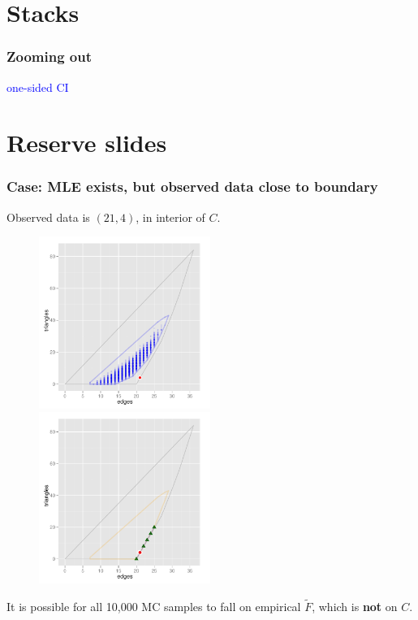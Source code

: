 \documentclass[ 10pt]{beamer}
\begin{document}
\section{Stacks}
\frame
{
\frametitle{Zooming out}  
\transboxin

\begin{center}
{\TINY \textcolor{blue}{one-sided CI}}






\end{center}
}



\appendix
{}
\setcounter{finalframe}{\value{framenumber}}


\section{Reserve slides}
\frame
{
\frametitle{Case: MLE exists, but observed data close to boundary}  
Observed data is $(21,4)$, in interior of $C$.
\begin{figure}[h]
\centering
\includegraphics[height=2.2in]{MCsample-problem}
\includegraphics[height=2.2in]{MCsample-fakeface}
\end{figure}
It is possible for all 10,000 MC samples to fall on empirical $\tilde{F}$, which is \textbf{not} on
$C$.
}
\end{document}
